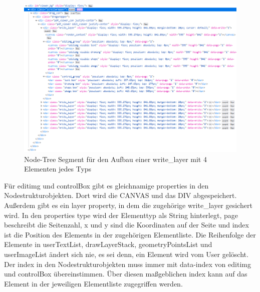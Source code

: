 \begin{figure}[!htbp]
	\centering
	\includegraphics[width=1\textwidth]{"images/write-layer.png"}
	\caption{Node-Tree Segment für den Aufbau einer write\_layer mit 4 Elementen jedes Typs}
	\label{fig:write-layer}
\end{figure}

Für editimg und controlBox gibt es gleichnamige properties in den Nodestrukturobjekten. Dort wird die CANVAS und das DIV abgespeichert. Außerdem gibt es ein layer property, in dem die zugehörige write\_layer gesichert wird. In den properties type wird der Elementtyp als String hinterlegt, page beschreibt die Seitenzahl, x und y sind die Koordinaten auf der Seite und index ist die Position des Elements in der zugehörigen Elementliste. Die Reihenfolge der Elemente in userTextList, drawLayerStack, geometryPointsList und userImageList ändert sich nie, es sei denn, ein Element wird vom User gelöscht. Der index in den Nodestrukturobjekten muss immer mit data-index von editimg und controlBox übereinstimmen. Über diesen maßgeblichen index kann auf das Element in der jeweiligen Elementliste zugegriffen werden.

